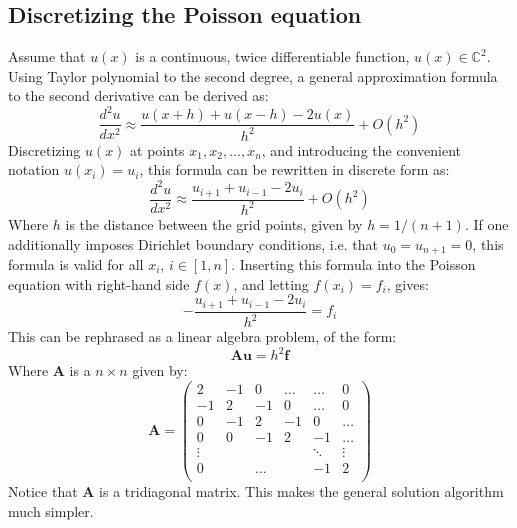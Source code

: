 \documentclass[a4paper, 10pt]{article}
\begin{document}
\subsection*{Discretizing the Poisson equation}
Assume that $u(x)$ is a continuous, twice differentiable function, $u(x) \in \mathbb{C}^2$. Using Taylor polynomial to the second degree, a general approximation formula to the second derivative can be derived as:
$$\frac{d^2 u}{dx^2}\approx \frac{u(x+h)+u(x-h)-2u(x)}{h^2}+O(h^2)$$
Discretizing $u(x)$ at points $x_1, x_2, ..., x_n$, and  introducing the convenient notation $u(x_i)=u_i$, this formula can be rewritten in discrete form as:
$$\frac{d^2 u}{dx^2}\approx \frac{u_{i+1}+u_{i-1}-2u_{i}}{h^2}+O(h^2)$$
Where $h$ is the distance between the grid points, given by $h=1/(n+1)$. If one additionally imposes Dirichlet boundary conditions, i.e. that $u_0=u_{n+1}=0$, this formula is valid for all $x_i$, $i\in [1, n]$. Inserting this formula into the Poisson equation with right-hand side $f(x)$, and letting $f(x_i)=f_i$, gives:
\begin{equation}\label{Poisson}
-\frac{u_{i+1}+u_{i-1}-2u_{i}}{h^2}=f_i
\end{equation}\label{Poisson}
This can be rephrased as a linear algebra problem, of the form:
$$\mathbf{A}\mathbf{u}=h^2\mathbf{f}$$
Where $\mathbf{A}$ is a $n \times n$ given by:
$$\mathbf{A}=\begin{pmatrix}
2 & -1 & 0 & \ldots &  \ldots & 0\\
-1 & 2 & -1  & 0 & \ldots & 0\\
0 & -1 & 2 &-1 & 0 & \ldots \\
0 & 0 & -1 & 2 &-1 &\ldots\\
\vdots &  & &  &\ddots & \vdots \\
0 && \ldots && -1&  2  \\
\end{pmatrix}$$
Notice that $\mathbf{A}$ is a tridiagonal matrix. This makes the general solution algorithm much simpler.
\end{document}
